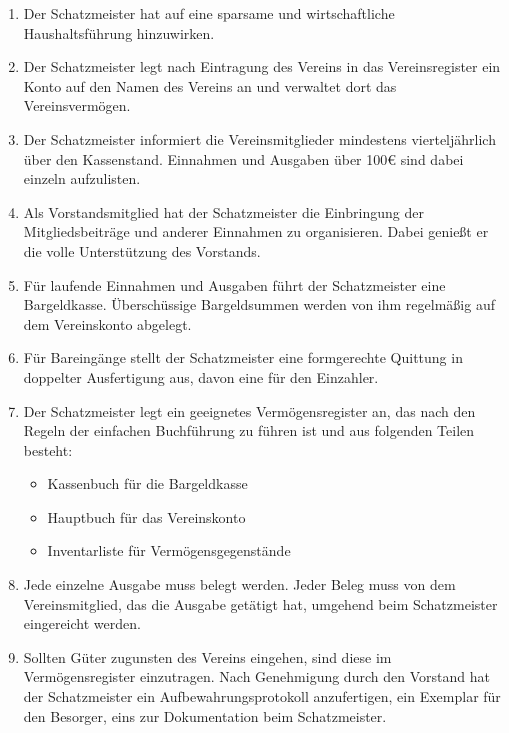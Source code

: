 \documentclass[fontsize=12pt,paper=a4,pagesize,headings=small]{scrartcl}
\begin{document}
\begin{enumerate}
    \item Der Schatzmeister hat auf eine sparsame und wirtschaftliche
        Haushaltsführung hinzuwirken.

    \item Der Schatzmeister legt nach Eintragung des Vereins in das
        Vereinsregister ein Konto auf den Namen des Vereins an und
        verwaltet dort das Vereinsvermögen.

    \item Der Schatzmeister informiert die Vereinsmitglieder
        mindestens vierteljährlich über den
        Kassenstand. Einnahmen und Ausgaben über 100\euro{} sind dabei
        einzeln aufzulisten.

    \item Als Vorstandsmitglied hat der Schatzmeister die Einbringung der
        Mitgliedsbeiträge und anderer Einnahmen zu organisieren. Dabei
        genießt er die volle Unterstützung des Vorstands.

    \item Für laufende Einnahmen und Ausgaben führt der Schatzmeister eine
        Bargeldkasse. Überschüssige Bargeldsummen werden von ihm regelmäßig
        auf dem Vereinskonto abgelegt.

    \item Für Bareingänge stellt der Schatzmeister eine formgerechte
        Quittung in doppelter Ausfertigung aus, davon eine für den Einzahler.

    \newpage{}

    \item Der Schatzmeister legt ein geeignetes Vermögensregister an, das
        nach den Regeln der einfachen Buchführung zu führen ist und aus
        folgenden Teilen besteht:
        \begin{itemize}
            \item Kassenbuch für die Bargeldkasse
            \item Hauptbuch für das Vereinskonto
            \item Inventarliste für Vermögensgegenstände
        \end{itemize}

    \item Jede einzelne Ausgabe muss belegt werden. Jeder Beleg muss von
        dem Vereinsmitglied, das die Ausgabe getätigt hat, umgehend beim
        Schatzmeister eingereicht werden.

    \item Sollten Güter zugunsten des Vereins eingehen, sind diese im
        Vermögensregister einzutragen. Nach Genehmigung durch den Vorstand hat
        der Schatzmeister ein Aufbewahrungsprotokoll anzufertigen, ein Exemplar
        für den Besorger, eins zur Dokumentation beim Schatzmeister.


\end{enumerate}
\end{document}
